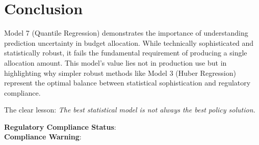 \section{Conclusion}

Model 7 (Quantile Regression) demonstrates the importance of understanding prediction uncertainty in budget allocation. While technically sophisticated and statistically robust, it fails the fundamental requirement of producing a single allocation amount. This model's value lies not in production use but in highlighting why simpler robust methods like Model 3 (Huber Regression) represent the optimal balance between statistical sophistication and regulatory compliance.

The clear lesson: \textit{The best statistical model is not always the best policy solution.}

\textbf{Regulatory Compliance Status}: \ModelSevenRegulatoryCompliant{}\\
\textbf{Compliance Warning}: \ModelSevenRegulatoryWarning{}